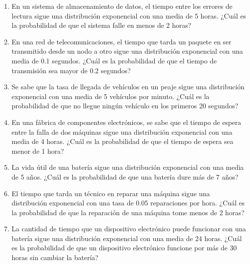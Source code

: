 \begin{Ejer}
\begin{enumerate}
    \item En un sistema de almacenamiento de datos, el tiempo entre los errores de lectura sigue una distribución exponencial con una media de 5 horas. ¿Cuál es la probabilidad de que el sistema falle en menos de 2 horas?

    \item En una red de telecomunicaciones, el tiempo que tarda un paquete en ser transmitido desde un nodo a otro sigue una distribución exponencial con una media de 0.1 segundos. ¿Cuál es la probabilidad de que el tiempo de transmisión sea mayor de 0.2 segundos?

    \item Se sabe que la tasa de llegada de vehículos en un peaje sigue una distribución exponencial con una media de 5 vehículos por minuto. ¿Cuál es la probabilidad de que no llegue ningún vehículo en los primeros 20 segundos?

    \item En una fábrica de componentes electrónicos, se sabe que el tiempo de espera entre la falla de dos máquinas sigue una distribución exponencial con una media de 4 horas. ¿Cuál es la probabilidad de que el tiempo de espera sea menor de 1 hora?

    \item La vida útil de una batería sigue una distribución exponencial con una media de 5 años. ¿Cuál es la probabilidad de que una batería dure más de 7 años?

    \item El tiempo que tarda un técnico en reparar una máquina sigue una distribución exponencial con una tasa de 0.05 reparaciones por hora. ¿Cuál es la probabilidad de que la reparación de una máquina tome menos de 2 horas?

    \item La cantidad de tiempo que un dispositivo electrónico puede funcionar con una batería sigue una distribución exponencial con una media de 24 horas. ¿Cuál es la probabilidad de que un dispositivo electrónico funcione por más de 30 horas sin cambiar la batería?


\end{enumerate}
\end{Ejer} 


